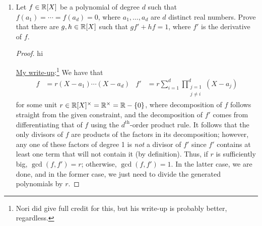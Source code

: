 \documentclass[../notes.tex]{subfiles}
\begin{document}
\begin{enumerate}
\begin{enumerate}
\begin{proof}[Answer]
        \end{proof}
        \item $f=X^2-13$.
        \begin{proof}[Answer]
            CliffsNotes version: $\tilde{f}=X^2+_21$, so $\tilde{f}(0)=1$ and $\tilde{f}(1)=0$. Thus, there is only $\boxed{1}$ possible homomorphism $\phi$, and the only possible value of $\phi(X)$ is $\boxed{0}$.
        \end{proof}
        \item $f=X^3-71$.
        \begin{proof}[Answer]
            Similar to part (b): $\tilde{f}=X^3+_21$, $\tilde{f}(0)=1$ and $\tilde{f}(1)=0$. Thus, there is only $\boxed{1}$ possible homomorphism $\phi$, and the only possible value of $\phi(X)$ is $\boxed{0}$.
        \end{proof}
        \item $f=X(X+1)^2(X+2)^3$.
        \begin{proof}[Answer]
            $\tilde{f}(0)=0\cdot_21^2\cdot_20^3=0$, and $\tilde{f}(1)=1\cdot_20^2\cdot_21^3=0$. Thus, there are $\boxed{0}$ possible homomorphisms $\phi$.
        \end{proof}
    \end{enumerate}
    \pagebreak
    \item Let $f\in\mathbb{R}[X]$ be a polynomial of degree $d$ such that $f(a_1)=\cdots=f(a_d)=0$, where $a_1,\dots,a_d$ are $d$ distinct real numbers. Prove that there are $g,h\in\mathbb{R}[X]$ such that $gf'+hf=1$, where $f'$ is the derivative of $f$.
    \begin{proof}
        {\color{white}hi}\par
        \underline{My write-up}:\footnote{Nori did give full credit for this, but his write-up is probably better, regardless.} We have that
        \begin{align*}
            f &= r(X-a_1)\cdots(X-a_d)&
            f' &= r\sum_{i=1}^d\prod_{\substack{j=1\\j\neq i}}^d(X-a_j)
        \end{align*}
        for some unit $r\in\mathbb{R}[X]^\times=\mathbb{R}^\times=\mathbb{R}-\{0\}$, where decomposition of $f$ follows straight from the given constraint, and the decomposition of $f'$ comes from differentiating that of $f$ using the $d^\text{th}$-order product rule. It follows that the only divisors of $f$ are products of the factors in its decomposition; however, any one of these factors of degree 1 is \emph{not} a divisor of $f'$ since $f'$ contains at least one term that will not contain it (by definition). Thus, if $r$ is sufficiently big, $\gcd(f,f')=r$; otherwise, $\gcd(f,f')=1$. In the latter case, we are done, and in the former case, we just need to divide the generated polynomials by $r$.\par

\end{proof}
\end{enumerate}
\end{document}

